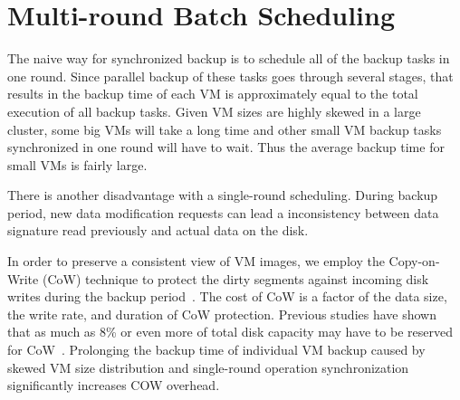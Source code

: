 \section{Multi-round Batch Scheduling}
\label{sect:scheduling}
The naive way for synchronized backup is   to schedule all of the backup tasks in one round.
Since parallel backup of these tasks goes through several stages,
that results in the backup time of each VM is approximately equal to the total execution of all backup tasks.
Given VM sizes are highly skewed in a large cluster, some big VMs will take a long time and other
small VM backup tasks synchronized in one round will have to wait.
Thus the average backup time for small VMs is fairly large. 


There is another disadvantage with a single-round scheduling. 
During backup period, new data modification requests can lead a inconsistency between data signature 
read previously and actual data on the disk.


In order to preserve a consistent view of VM images, we employ
the Copy-on-Write (CoW) technique to protect the dirty segments against incoming disk writes during 
the backup period~\cite{VMare2013}. 
The cost of CoW is a factor of the data size, the write rate, and duration of CoW protection.
Previous studies have shown that as much as 8\% or even more of total disk capacity may have to be 
reserved for CoW~\cite{EMCIncrementalDataChanges}.
Prolonging the backup time of individual VM backup  caused by skewed VM size distribution
and single-round operation synchronization significantly increases COW overhead.

